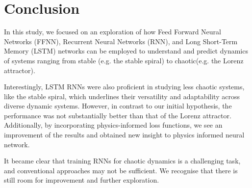 \section{Conclusion}\label{conclusion}

In this study, we focused on an exploration of how Feed Forward Neural Networks (FFNN), Recurrent Neural Networks (RNN), and Long Short-Term Memory (LSTM) networks can be employed to understand and predict dynamics of systems ranging from stable (e.g. the stable spiral) to chaotic(e.g. the Lorenz attractor). 

Interestingly, LSTM RNNs were also proficient in studying less chaotic systems, like the stable spiral, which underlines their versatility and adaptability across diverse dynamic systems. However, in contrast to our initial hypothesis, the performance was not substantially better than that of the Lorenz attractor. Additionally, by incorporating physics-informed loss functions, we see an improvement of the results and obtained new insight to physics informed neural network. 

It became clear that training RNNs for chaotic dynamics is a challenging task, and conventional approaches may not be sufficient. We recognise that there is still room for improvement and further exploration. 
